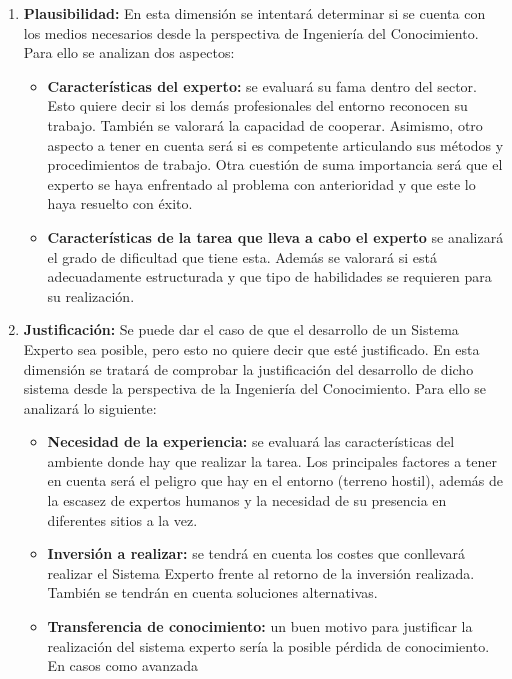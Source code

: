 \begin{enumerate}
  \item \textbf{Plausibilidad:} En esta dimensión se intentará determinar si se cuenta
  con los medios necesarios desde la perspectiva de Ingeniería del Conocimiento.
  Para ello se analizan dos aspectos:
  \begin{itemize}
    \item \textbf{Características del experto:} se evaluará su fama dentro del sector.
      Esto quiere decir si los demás profesionales del entorno reconocen su trabajo. También
      se valorará la capacidad de cooperar. Asimismo, otro aspecto a tener en cuenta será
      si es competente articulando sus métodos y procedimientos de trabajo. Otra cuestión
      de suma importancia será que el experto se haya enfrentado al problema con anterioridad
      y que este lo haya resuelto con éxito.
    \item \textbf{Características de la tarea que lleva a cabo el experto} se analizará el
      grado de dificultad que tiene esta. Además se valorará si está adecuadamente estructurada
      y que tipo de habilidades se requieren para su realización.
  \end{itemize}
  \item \textbf{Justificación:} Se puede dar el caso de que el desarrollo de un Sistema Experto
    sea posible, pero esto no quiere decir que esté justificado. En esta dimensión se tratará
    de comprobar la justificación del desarrollo de dicho sistema desde la perspectiva de la
    Ingeniería del Conocimiento. Para ello se analizará lo siguiente:
    \begin{itemize}
      \item \textbf{Necesidad de la experiencia:} se evaluará las características del ambiente
        donde hay que realizar la tarea. Los principales factores a tener en cuenta será
        el peligro que hay en el entorno (terreno hostil), además de la escasez de expertos
        humanos y la necesidad de su presencia en diferentes sitios a la vez.
      \item \textbf{Inversión a realizar:} se tendrá en cuenta los costes que conllevará
        realizar el Sistema Experto frente al retorno de la inversión realizada. También se
        tendrán en cuenta soluciones alternativas.
      \item \textbf{Transferencia de conocimiento:} un buen motivo para justificar la realización
        del sistema experto sería la posible pérdida de conocimiento. En casos como avanzada

\end{itemize}
\end{enumerate}
